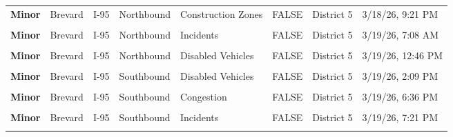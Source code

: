 \documentclass[
]{article}
\begin{document}
\begin{longtable}[t]{>{\raggedright\arraybackslash}p{1.5cm}>{\raggedright\arraybackslash}p{2.5cm}>{\raggedright\arraybackslash}p{3cm}>{\raggedright\arraybackslash}p{1.8cm}>{\raggedright\arraybackslash}p{2.5cm}lll}
\textbf{Minor} & Brevard & I-95 & Northbound & Construction Zones & FALSE & District 5 & 3/18/26, 9:21 PM\\
\textbf{\cellcolor{gray!10}{Minor}} & \cellcolor{gray!10}{Brevard} & \cellcolor{gray!10}{I-95} & \cellcolor{gray!10}{Southbound} & \cellcolor{gray!10}{Incidents} & \cellcolor{gray!10}{FALSE} & \cellcolor{gray!10}{District 5} & \cellcolor{gray!10}{3/18/26, 7:56 PM}\\
\addlinespace
\textbf{Minor} & Brevard & I-95 & Northbound & Incidents & FALSE & District 5 & 3/19/26, 7:08 AM\\
\textbf{\cellcolor{gray!10}{Minor}} & \cellcolor{gray!10}{Brevard} & \cellcolor{gray!10}{I-95} & \cellcolor{gray!10}{Southbound} & \cellcolor{gray!10}{Congestion} & \cellcolor{gray!10}{FALSE} & \cellcolor{gray!10}{District 5} & \cellcolor{gray!10}{3/19/26, 9:27 AM}\\
\textbf{Minor} & Brevard & I-95 & Northbound & Disabled Vehicles & FALSE & District 5 & 3/19/26, 12:46 PM\\
\textbf{\cellcolor{gray!10}{Minor}} & \cellcolor{gray!10}{Brevard} & \cellcolor{gray!10}{I-95} & \cellcolor{gray!10}{Southbound} & \cellcolor{gray!10}{Disabled Vehicles} & \cellcolor{gray!10}{FALSE} & \cellcolor{gray!10}{District 5} & \cellcolor{gray!10}{3/19/26, 9:27 AM}\\
\textbf{Minor} & Brevard & I-95 & Southbound & Disabled Vehicles & FALSE & District 5 & 3/19/26, 2:09 PM\\
\addlinespace
\textbf{\cellcolor{gray!10}{Minor}} & \cellcolor{gray!10}{Brevard} & \cellcolor{gray!10}{I-95} & \cellcolor{gray!10}{Southbound} & \cellcolor{gray!10}{Disabled Vehicles} & \cellcolor{gray!10}{FALSE} & \cellcolor{gray!10}{District 5} & \cellcolor{gray!10}{3/19/26, 6:01 PM}\\
\textbf{Minor} & Brevard & I-95 & Southbound & Congestion & FALSE & District 5 & 3/19/26, 6:36 PM\\
\textbf{\cellcolor{gray!10}{Minor}} & \cellcolor{gray!10}{Brevard} & \cellcolor{gray!10}{I-95} & \cellcolor{gray!10}{Northbound} & \cellcolor{gray!10}{Disabled Vehicles} & \cellcolor{gray!10}{FALSE} & \cellcolor{gray!10}{District 5} & \cellcolor{gray!10}{3/19/26, 7:21 PM}\\
\textbf{Minor} & Brevard & I-95 & Southbound & Incidents & FALSE & District 5 & 3/19/26, 7:21 PM\\
\textbf{\cellcolor{gray!10}{Minor}} & \cellcolor{gray!10}{Brevard} & \cellcolor{gray!10}{I-95} & \cellcolor{gray!10}{Northbound} & \cellcolor{gray!10}{Disabled Vehicles} & \cellcolor{gray!10}{FALSE} & \cellcolor{gray!10}{District 5} & \cellcolor{gray!10}{3/19/26, 7:52 PM}\\

\end{longtable}
\end{document}
